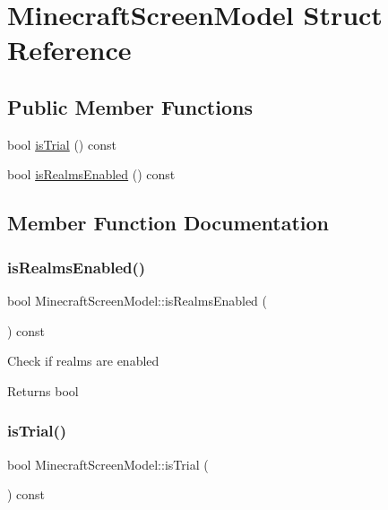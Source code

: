 \hypertarget{struct_minecraft_screen_model}{}\section{Minecraft\+Screen\+Model Struct Reference}
\label{struct_minecraft_screen_model}
\subsection*{Public Member Functions}
\begin{DoxyCompactItemize}
\item 
bool \mbox{\hyperlink{struct_minecraft_screen_model_a9faa9a23db27e475cebee6266d56612d}{is\+Trial}} () const
\item 
bool \mbox{\hyperlink{struct_minecraft_screen_model_ac91cf77cf101ffed0000892c8ec2f9f7}{is\+Realms\+Enabled}} () const
\end{DoxyCompactItemize}


\subsection{Member Function Documentation}
\mbox{\label{struct_minecraft_screen_model_ac91cf77cf101ffed0000892c8ec2f9f7}} 
\subsubsection{\texorpdfstring{isRealmsEnabled()}{isRealmsEnabled()}}
{\footnotesize\ttfamily bool Minecraft\+Screen\+Model\+::is\+Realms\+Enabled (\begin{DoxyParamCaption}{ }\end{DoxyParamCaption}) const}

Check if realms are enabled \begin{DoxyReturn}{Returns}
bool 
\end{DoxyReturn}
\mbox{\label{struct_minecraft_screen_model_a9faa9a23db27e475cebee6266d56612d}} 
\subsubsection{\texorpdfstring{isTrial()}{isTrial()}}
{\footnotesize\ttfamily bool Minecraft\+Screen\+Model\+::is\+Trial (\begin{DoxyParamCaption}{ }\end{DoxyParamCaption}) const}

